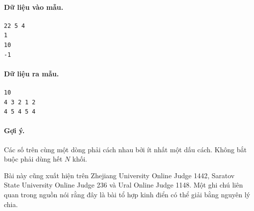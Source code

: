 \documentclass[11pt]{article}
\begin{document}
\paragraph{Dữ liệu vào mẫu.}
\begin{verbatim}
22 5 4
1
10
-1
\end{verbatim}

\paragraph{Dữ liệu ra mẫu.}
\begin{verbatim}
10
4 3 2 1 2
4 5 4 5 4
\end{verbatim}

\paragraph{Gợi ý.}
Các số trên cùng một dòng phải cách nhau bởi ít nhất một dấu cách. Không bắt
buộc phải dùng hết \(N\) khối.

Bài này cũng xuất hiện trên Zhejiang University Online Judge 1442, Saratov
State University Online Judge 236 và Ural Online Judge 1148. Một ghi chú liên
quan trong nguồn nói rằng đây là bài tổ hợp kinh điển có thể giải bằng nguyên
lý chia.
\end{document}
